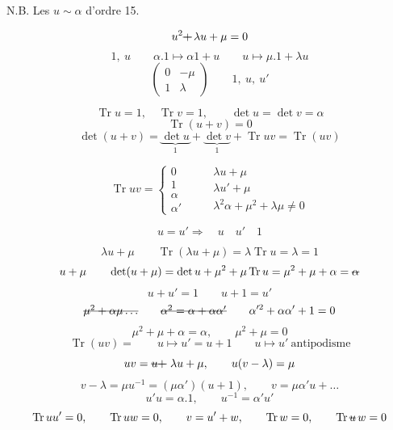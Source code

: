 \documentclass[11pt,a4paper]{article}
\begin{document}
N.B. Les $u \sim \alpha$ d'ordre 15.

\[
u^2 \text{\struck{$+$}}\, \lambda u + \mu = 0
\]
\[
1,\ u \qquad \alpha.1 \longmapsto \alpha 1 + u \qquad
u \longmapsto \mu.1 + \lambda u
\]
\[
\begin{pmatrix} 0 & -\mu \\ 1 & \lambda \end{pmatrix}
\qquad 1,\ u,\ u'
\]

\[
\operatorname{Tr} u = 1, \quad \operatorname{Tr} v = 1, \qquad
\det u = \det v = \alpha
\]
\[
\operatorname{Tr}(u+v) = 0
\]
\[
\det(u+v) = \underbrace{\det u}_{1} + \underbrace{\det v}_{1}
+ \operatorname{Tr} u v = \operatorname{Tr}(uv)
\]

\[
\operatorname{Tr} u v = \left\{
\begin{array}{l} 0 \\ 1 \\ \alpha \\ \alpha' \end{array}
\right.
\qquad
\begin{array}{|l}
\lambda u + \mu \\
\lambda u' + \mu \\
\lambda^2 \alpha + \mu^2 + \lambda\mu \neq 0
\end{array}
\]


\[
u = u' \Longrightarrow \quad u \quad u' \quad 1
\]

\[
\lambda u + \mu \qquad
\operatorname{Tr}(\lambda u + \mu) = \lambda \operatorname{Tr} u = \lambda = 1
\]
\[
u + \mu \qquad
\det(u+\mu) = \det u + \mu^2 + \mu \operatorname{Tr} u
= \mu^2 + \mu + \alpha = \text{\struck{$\alpha$}}
\]
\[
u + u' = 1 \qquad u + 1 = u'
\]
\[
\text{\struck{$\mu^2 + \alpha\mu \ldots$}} \qquad
\text{\struck{$\alpha^2 = \alpha + \alpha\alpha'$}} \qquad
\alpha'^2 + \alpha\alpha' + 1 = 0
\]
\[
\mu^2 + \mu + \alpha = \alpha, \qquad \mu^2 + \mu = 0
\]
\[
\operatorname{Tr}(uv) = \qquad u \longmapsto u' = u + 1
\qquad u \longmapsto u' \ \text{antipodisme}
\]
\[
uv = \text{\struck{$u+$}}\ \lambda u + \mu, \qquad
u(v - \lambda) = \mu
\]
\[
v - \lambda = \mu u^{-1} = (\mu\alpha')(u+1), \qquad
v = \mu\alpha' u + \ldots
\]
\[
u' u = \alpha. 1, \qquad u^{-1} = \alpha' u'
\]
\[
\operatorname{Tr} u u' = 0, \qquad \operatorname{Tr} u w = 0, \qquad
v = u' + w, \qquad \operatorname{Tr} w = 0, \qquad
\operatorname{Tr} \text{\struck{$u$}}\, w = 0
\]
\end{document}
